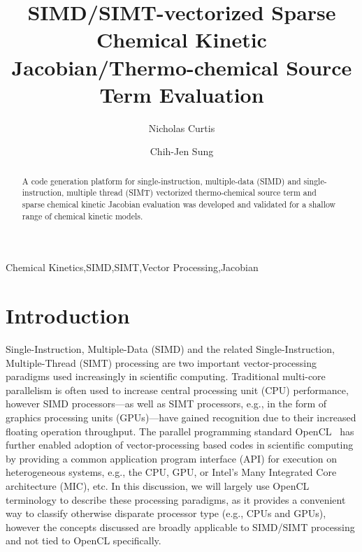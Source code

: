 \documentclass[12pt,number,sort&compress,preprint]{elsarticle}
\title{SIMD\slash SIMT-vectorized Sparse Chemical Kinetic Jacobian\slash Thermo-chemical Source Term Evaluation}
\author[1]{Nicholas Curtis\corref{corr}}
\author[1]{Chih-Jen Sung}
\begin{document}
\begin{frontmatter}

\begin{abstract} %
A code generation platform for single-instruction, multiple-data (SIMD) and single-instruction, multiple thread (SIMT) vectorized thermo-chemical source term and sparse chemical kinetic Jacobian evaluation was developed and validated for a shallow range of chemical kinetic models.
\end{abstract}

\begin{keyword}
    Chemical Kinetics\sep SIMD\sep SIMT\sep Vector Processing\sep Jacobian
\end{keyword}

\end{frontmatter}

\section{Introduction}
%

Single-Instruction, Multiple-Data (SIMD) and the related Single-Instruction, Multiple-Thread (SIMT) processing are two important vector-processing paradigms used increasingly in scientific computing.
Traditional multi-core parallelism is often used to increase central processing unit (CPU) performance, however SIMD processors---as well as SIMT processors, e.g., in the form of graphics processing units (GPUs)---have gained recognition due to their increased floating operation throughput.
The parallel programming standard OpenCL~\cite{stone2010opencl} has further enabled adoption of vector-processing based codes in scientific computing by providing a common application program interface (API) for execution on heterogeneous systems, e.g., the CPU, GPU, or Intel's Many Integrated Core architecture (MIC), etc.
In this discussion, we will largely use OpenCL terminology to describe these processing paradigms, as it provides a convenient way to classify otherwise disparate processor type (e.g., CPUs and GPUs), however the concepts discussed are broadly applicable to SIMD\slash SIMT processing and not tied to OpenCL specifically.
\end{document}

